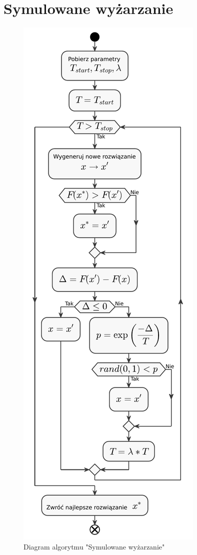 \section{Symulowane wyżarzanie}
\begin{figure}[H]
    \centering
    \includegraphics[height=\textheight]{chapters/chapter4/sa.pdf}
    \caption{Diagram algorytmu "Symulowane wyżarzanie"}
    \label{sa}
\end{figure}